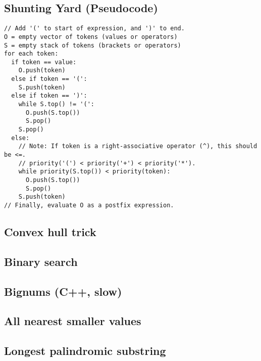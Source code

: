 \documentclass[10pt]{extarticle}
\begin{document}
\begin{multicols*}{3}
\subsection{Shunting Yard (Pseudocode)} %
\begin{lstlisting}
// Add '(' to start of expression, and ')' to end.
O = empty vector of tokens (values or operators)
S = empty stack of tokens (brackets or operators)
for each token:
  if token == value:
    O.push(token)
  else if token == '(':
    S.push(token)
  else if token == ')':
    while S.top() != '(':
      O.push(S.top())
      S.pop()
    S.pop()
  else:
    // Note: If token is a right-associative operator (^), this should be <=.
	// priority('(') < priority('+') < priority('*').
    while priority(S.top()) < priority(token):
      O.push(S.top())
      S.pop()
    S.push(token)
// Finally, evaluate O as a postfix expression.
\end{lstlisting}

\subsection{Convex hull trick} %


\subsection{Binary search} %


\subsection{Bignums (C++, slow)} %


\subsection{All nearest smaller values} %


\subsection{Longest palindromic substring} %

\end{multicols*}
\end{document}
